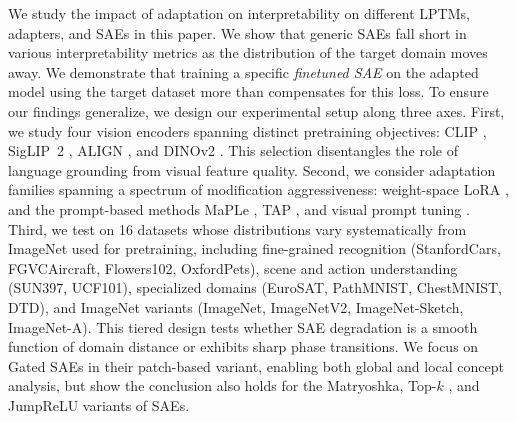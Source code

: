 We study the impact of adaptation on interpretability on different LPTMs, adapters, and SAEs in this paper. We show that generic SAEs fall short in various interpretability metrics as the distribution of the target domain moves away. We demonstrate that training a specific {\em finetuned SAE} on the adapted model using the target dataset more than compensates for this loss. To ensure our findings generalize, we design our experimental setup along three axes. First, we study four vision encoders spanning distinct pretraining objectives: CLIP \citep{radford2021learning}, SigLIP~2 \citep{tschannen2025siglip2}, ALIGN \citep{jia2021scaling}, and DINOv2 \citep{oquab2024dinov2}. This selection disentangles the role of language grounding from visual feature quality. Second, we consider adaptation families spanning a spectrum of modification aggressiveness: weight-space LoRA \citep{hu2022lora}, and the prompt-based methods MaPLe \citep{khattak2023maple}, TAP \citep{ding2025tap}, and visual prompt tuning \citep{jia2022visual}. Third, we test on 16 datasets whose distributions vary systematically from ImageNet used for pretraining, including fine-grained recognition (StanfordCars, FGVCAircraft, Flowers102, OxfordPets), scene and action understanding (SUN397, UCF101), specialized domains (EuroSAT, PathMNIST, ChestMNIST, DTD), and ImageNet variants (ImageNet, ImageNetV2, ImageNet-Sketch, ImageNet-A). This tiered design tests whether SAE degradation is a smooth function of domain distance or exhibits sharp phase transitions. We focus on Gated SAEs \citep{rajamanoharan2024improving} in their patch-based variant, enabling both global and local concept analysis, but show the conclusion also holds for the Matryoshka, Top-$k$ \citep{gao2025scaling}, and JumpReLU \citep{rajamanoharan2024jumprelu} variants of SAEs.




